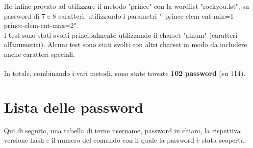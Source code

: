 \documentclass[11pt]{article} %
\begin{document}
Ho infine provato ad utilizzare il metodo "prince" con la wordlist "rockyou.lst", su password di 7 e 8 caratteri, utilizzando i parametri "--prince-elem-cnt-min=1 --prince-elem-cnt-max=2". \\
I test sono stati svolti principalmente utilizzando il charset "alnum" (caratteri alfanumerici). Alcuni test sono stati svolti con altri charset in modo da includere anche caratteri speciali. \\
\\
In totale, combinando i vari metodi, sono state trovate \textbf{102 password} (su 114).
\newpage

\section{Lista delle password}
Qui di seguito, una tabella di terne username, password in chiaro, la rispettiva versione hash e il numero del comando con il quale la password è stata scoperta: \\
\end{document}
